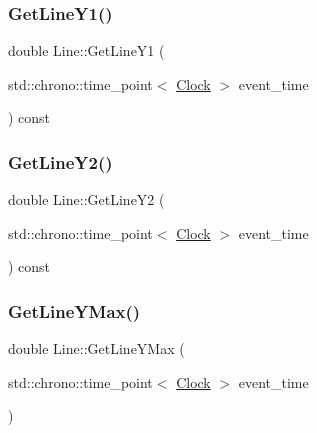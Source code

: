 \mbox{\label{classLine_ac09a53b36a300c38191269f110c73eb1}} 
\subsubsection{\texorpdfstring{Get\+Line\+Y1()}{GetLineY1()}}
{\footnotesize\ttfamily double Line\+::\+Get\+Line\+Y1 (\begin{DoxyParamCaption}\item[{std\+::chrono\+::time\+\_\+point$<$ \mbox{\hyperlink{universe_8h_a0ef8d951d1ca5ab3cfaf7ab4c7a6fd80}{Clock}} $>$}]{event\+\_\+time }\end{DoxyParamCaption}) const\hspace{0.3cm}{\ttfamily [inline]}}

\mbox{\label{classLine_a6222d15f883f3183ec9eed085046916a}} 
\subsubsection{\texorpdfstring{Get\+Line\+Y2()}{GetLineY2()}}
{\footnotesize\ttfamily double Line\+::\+Get\+Line\+Y2 (\begin{DoxyParamCaption}\item[{std\+::chrono\+::time\+\_\+point$<$ \mbox{\hyperlink{universe_8h_a0ef8d951d1ca5ab3cfaf7ab4c7a6fd80}{Clock}} $>$}]{event\+\_\+time }\end{DoxyParamCaption}) const\hspace{0.3cm}{\ttfamily [inline]}}

\mbox{\label{classLine_ab033cff3a24b67be829759d16f13c281}} 
\subsubsection{\texorpdfstring{Get\+Line\+Y\+Max()}{GetLineYMax()}}
{\footnotesize\ttfamily double Line\+::\+Get\+Line\+Y\+Max (\begin{DoxyParamCaption}\item[{std\+::chrono\+::time\+\_\+point$<$ \mbox{\hyperlink{universe_8h_a0ef8d951d1ca5ab3cfaf7ab4c7a6fd80}{Clock}} $>$}]{event\+\_\+time }\end{DoxyParamCaption})\hspace{0.3cm}{\ttfamily [inline]}}

